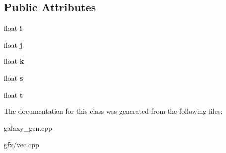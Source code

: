 \subsection*{Public Attributes}
\begin{DoxyCompactItemize}
\item 
float {\bfseries i}\hypertarget{classStarSystemGent_1_1Vector_aefa62b06e00b482227c81eaa8a897f0e}{}\label{classStarSystemGent_1_1Vector_aefa62b06e00b482227c81eaa8a897f0e}

\item 
float {\bfseries j}\hypertarget{classStarSystemGent_1_1Vector_a9b486c3dcfde00928dd77cf5fbc8cf5e}{}\label{classStarSystemGent_1_1Vector_a9b486c3dcfde00928dd77cf5fbc8cf5e}

\item 
float {\bfseries k}\hypertarget{classStarSystemGent_1_1Vector_a2f976d34859997bea44c45cb5da309ac}{}\label{classStarSystemGent_1_1Vector_a2f976d34859997bea44c45cb5da309ac}

\item 
float {\bfseries s}\hypertarget{classStarSystemGent_1_1Vector_a4a64ebc87a66071ac7a6d310111ef6c3}{}\label{classStarSystemGent_1_1Vector_a4a64ebc87a66071ac7a6d310111ef6c3}

\item 
float {\bfseries t}\hypertarget{classStarSystemGent_1_1Vector_abfbc19ffc4986ccc876cf84154e389df}{}\label{classStarSystemGent_1_1Vector_abfbc19ffc4986ccc876cf84154e389df}

\end{DoxyCompactItemize}


The documentation for this class was generated from the following files\+:\begin{DoxyCompactItemize}
\item 
galaxy\+\_\+gen.\+cpp\item 
gfx/vec.\+cpp\end{DoxyCompactItemize}
